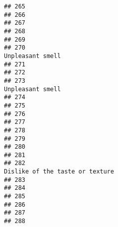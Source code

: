 \documentclass[
]{article}
\begin{document}
\begin{verbatim}
## 265                                                                                                        
## 266                                                                                                        
## 267                                                                                                        
## 268                                                                                                        
## 269                                                                                                        
## 270                                                                                        Unpleasant smell
## 271                                                                                                        
## 272                                                                                                        
## 273                                                                                        Unpleasant smell
## 274                                                                                                        
## 275                                                                                                        
## 276                                                                                                        
## 277                                                                                                        
## 278                                                                                                        
## 279                                                                                                        
## 280                                                                                                        
## 281                                                                                                        
## 282                                                                         Dislike of the taste or texture
## 283                                                                                                        
## 284                                                                                                        
## 285                                                                                                        
## 286                                                                                                        
## 287                                                                                                        
## 288                                                                                                        

\end{verbatim}
\end{document}
